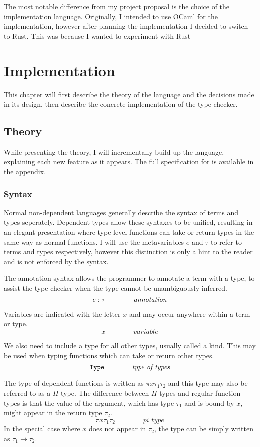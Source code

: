 \documentclass[12pt,a4paper,twoside]{report}
\begin{document}
The most notable difference from my project proposal is the choice of the implementation language.
Originally, I intended to use OCaml for the implementation, however after planning the implementation I decided to switch to Rust.
This was because I wanted to experiment with Rust

\chapter{Implementation}

This chapter will first describe the theory of the language and the decisions made in its design, then describe the concrete implementation of the type checker.

\section{Theory}

While presenting the theory, I will incrementally build up the language, explaining each new feature as it appears.
The full specification for \pimu{} is available in the appendix. 

\subsection{Syntax}

Normal non-dependent languages generally describe the syntax of terms and types seperately.
Dependent types allow these syntaxes to be unified, resulting in an elegant presentation where type-level functions can take or return types in the same way as normal functions.
I will use the metavariables \(e\) and \(\tau\) to refer to terms and types respectively, however this distinction is only a hint to the reader and is not enforced by the syntax.

The annotation syntax allows the programmer to annotate a term with a type, to assist the type checker when the type cannot be unambiguously inferred.
\[
    e : \tau \qquad\qquad \textit{annotation}
\]

Variables are indicated with the letter \(x\) and may occur anywhere within a term or type.
\[
    x \qquad\qquad \textit{variable}
\]

We also need to include a type for all other types, usually called a kind.
This may be used when typing functions which can take or return other types.
\[
    \mathtt{Type}{} \qquad\qquad \textit{type of types}
\]

The type of dependent functions is written as \(\pi{x}{\tau_1}{\tau_2}\) and this type may also be referred to as a \(\Pi\)-type.
The difference between \(\Pi\)-types and regular function types is that the value of the argument, which has type \(\tau_1\) and is bound by \(x\), might appear in the return type \(\tau_2\).
\[
    \pi{x}{\tau_1}{\tau_2} \qquad\qquad \textit{pi type}
\]
In the special case where \(x\) does not appear in \(\tau_2\), the type can be simply written as \(\tau_1 \rightarrow \tau_2\).
\end{document}
